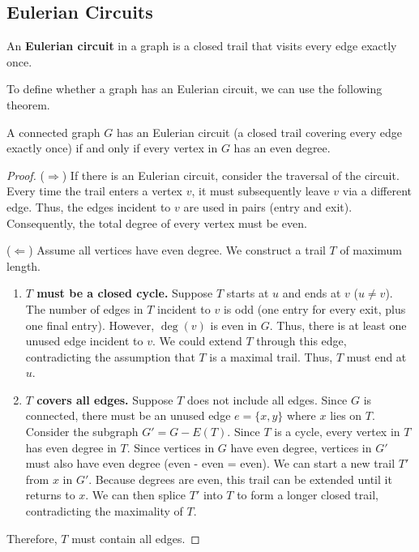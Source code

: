 \documentclass[oneside]{book}
\begin{document}
\subsection{Eulerian Circuits}

\begin{definition}
An \textbf{Eulerian circuit} in a graph is a closed trail that visits every edge exactly once.
\end{definition}

To define whether a graph has an Eulerian circuit, we can use the following theorem.

\begin{theorem}
A connected graph $G$ has an Eulerian circuit (a closed trail covering every edge exactly once) if and only if every vertex in $G$ has an even degree.
\end{theorem}

\begin{proof}
($\Rightarrow$) If there is an Eulerian circuit, consider the traversal of the circuit. Every time the trail enters a vertex $v$, it must subsequently leave $v$ via a different edge. Thus, the edges incident to $v$ are used in pairs (entry and exit). Consequently, the total degree of every vertex must be even.

($\Leftarrow$) Assume all vertices have even degree. We construct a trail $T$ of maximum length.
\begin{enumerate}
    \item \textbf{$T$ must be a closed cycle.} Suppose $T$ starts at $u$ and ends at $v$ ($u \neq v$). The number of edges in $T$ incident to $v$ is odd (one entry for every exit, plus one final entry). However, $\deg(v)$ is even in $G$. Thus, there is at least one unused edge incident to $v$. We could extend $T$ through this edge, contradicting the assumption that $T$ is a maximal trail. Thus, $T$ must end at $u$.
    \item \textbf{$T$ covers all edges.} Suppose $T$ does not include all edges. Since $G$ is connected, there must be an unused edge $e=\{x, y\}$ where $x$ lies on $T$. Consider the subgraph $G' = G - E(T)$. Since $T$ is a cycle, every vertex in $T$ has even degree in $T$. Since vertices in $G$ have even degree, vertices in $G'$ must also have even degree (even - even = even).
    We can start a new trail $T'$ from $x$ in $G'$. Because degrees are even, this trail can be extended until it returns to $x$. We can then splice $T'$ into $T$ to form a longer closed trail, contradicting the maximality of $T$.
\end{enumerate}
Therefore, $T$ must contain all edges.
\end{proof}
\end{document}
